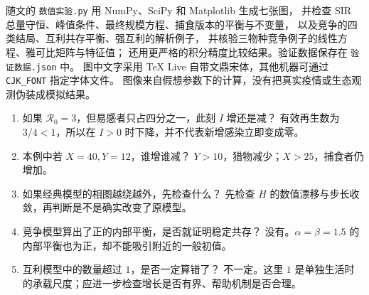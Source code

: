 \documentclass[UTF8,11pt,fontset=none]{ctexart}
\begin{document}
随文的 \texttt{数值实验.py} 用 NumPy、SciPy 和 Matplotlib 生成七张图，
并检查 SIR 总量守恒、峰值条件、最终规模方程、捕食版本的平衡与不变量，
以及竞争的四类结局、互利共存平衡、强互利的解析例子，
并核验三物种竞争例子的线性方程、雅可比矩阵与特征值；
还用更严格的积分精度比较结果。验证数据保存在 \texttt{验证数据.json} 中。
图中文字采用 TeX Live 自带文鼎宋体，其他机器可通过 \texttt{CJK\_FONT} 指定字体文件。
图像来自假想参数下的计算，没有把真实疫情或生态观测伪装成模拟结果。

\begin{keybox}
\begin{enumerate}
\item 如果 $\mathcal R_0=3$，但易感者只占四分之一，此刻 $I$ 增还是减？
有效再生数为 $3/4<1$，所以在 $I>0$ 时下降，并不代表新增感染立即变成零。
\item 本例中若 $X=40,Y=12$，谁增谁减？
$Y>10$，猎物减少；$X>25$，捕食者仍增加。
\item 如果经典模型的相图越绕越外，先检查什么？
先检查 $H$ 的数值漂移与步长收敛，再判断是不是确实改变了原模型。
\item 竞争模型算出了正的内部平衡，是否就证明稳定共存？
没有。$\alpha=\beta=1.5$ 的内部平衡也为正，却不能吸引附近的一般初值。
\item 互利模型中的数量超过 $1$，是否一定算错了？
不一定。这里 $1$ 是单独生活时的承载尺度；应进一步检查增长是否有界、帮助机制是否合理。
\end{enumerate}
\end{keybox}
\end{document}
